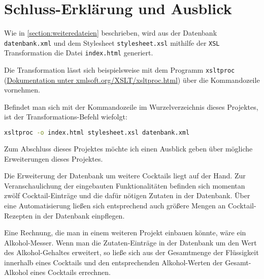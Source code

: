 \chapter{Schluss-Erklärung und Ausblick}
\label{chap:Schluss-Erklärung und Ausblick}


Wie in \ref{section:weiteredateien} beschrieben, wird aus der Datenbank \texttt{datenbank.xml} und dem Stylesheet \texttt{stylesheet.xsl} mithilfe der \texttt{XSL} Transformation die Datei \texttt{index.html} generiert.

Die Transformation lässt sich beispielsweise mit dem Programm \texttt{xsltproc} (\href{http://xmlsoft.org/XSLT/xsltproc.html}{Dokumentation unter xmlsoft.org/XSLT/xsltproc.html}) über die Kommandozeile vornehmen.

Befindet man sich mit der Kommandozeile im Wurzelverzeichnis dieses Projektes, ist der Transformations-Befehl wiefolgt:

\begin{lstlisting}[language=bash, caption=\texttt{XSL} Transformation]
xsltproc -o index.html stylesheet.xsl datenbank.xml
\end{lstlisting}

Zum Abschluss dieses Projektes möchte ich einen Ausblick geben über mögliche Erweiterungen dieses Projektes.

Die Erweiterung der Datenbank um weitere Cocktails liegt auf der Hand. Zur Veranschaulichung der eingebauten Funktionalitäten befinden sich momentan zwölf Cocktail-Einträge und die dafür nötigen Zutaten in der Datenbank. Über eine Automatisierung ließen sich entsprechend auch größere Mengen an Cocktail-Rezepten in der Datenbank einpflegen.

Eine Rechnung, die man in einem weiteren Projekt einbauen könnte, wäre ein Alkohol-Messer. Wenn man die Zutaten-Einträge in der Datenbank um den Wert des Alkohol-Gehaltes erweitert, so ließe sich aus der Gesamtmenge der Flüssigkeit innerhalb eines Cocktails und den entsprechenden Alkohol-Werten der Gesamt-Alkohol eines Cocktails errechnen.
